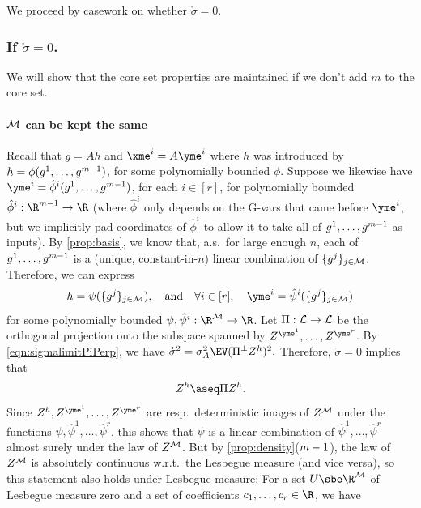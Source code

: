 \documentclass[main.tex]{subfiles}
\begin{document}
We proceed by casework on whether $\mathring \sigma = 0$.

\newcommand{\Lsq}{\mathcal{L}}
\subsubsection{If \texorpdfstring{$\mathring \sigma = 0$}{sigma converges to 0 a.s.}.}

We will show that the core set properties are maintained if we don't add $m$ to the core set.

\paragraph{$\mathcal{M}$ can be kept the same}
Recall that $g = Ah$ and $\xme^i = A \yme^i$ where $h$ was introduced by $h = \phi(g^{1}, \ldots, g^{m - 1})$, for some polynomially bounded $\phi$.
Suppose we likewise have $\yme^i = \hat \phi^i(g^1, \ldots, g^{\MM-1})$, for each $i \in [r]$, for polynomially bounded $\hat \phi^i: \R^{\MM-1} \to \R$ (where $\hat\phi^i$ only depends on the G-vars that came before $\yme^i$, but we implicitly pad coordinates of $\hat \phi^i$ to allow it to take all of $g^1, \ldots, g^{m-1}$ as inputs).
By \ref{prop:basis}, we know that, a.s.\ for large enough $n$, each of $g^1, \ldots, g^{m-1}$ is a (unique, constant-in-$n$) linear combination of $\{g^j\}_{j \in \mathcal{M}}$.
Therefore, we can express
\begin{equation}h = \psi(\{g^j\}_{j \in \coreset}),\quad\text{and}\quad
\forall i \in [r],\quad \yme^i = \hat {\psi}^i(\{g^j\}_{j \in \coreset})
\label{eqn:psireduce}
\end{equation}
for some polynomially bounded $\psi, \hat {\psi}^i: \R^\coreset \to \R$.
Let $\Pi: \mathcal{L} \to \mathcal{L}$ be the orthogonal projection onto the subspace spanned by $Z^{\yme^1}, \ldots, Z^{\yme^r}$.
By \cref{eqn:sigmalimitPiPerp}, we have
\(
\mathring\sigma^2
    =
        \sigma_A^2 \EV (\Pi^\perp Z^h)^2
        .
\)
Therefore, $\mathring \sigma = 0$ implies that 
\[Z^h \aseq \Pi Z^h.\]
Since $Z^h, Z^{\yme^1}, \ldots, Z^{\yme^r}$ are resp.\ deterministic images of $Z^{\mathcal{M}}$ under the functions $\psi, \hat \psi^1, \ldots, \hat \psi^r$, this shows that $\psi$ is a linear combination of $\hat \psi^1, \ldots, \hat \psi^r$ almost surely under the law of $Z^{\mathcal{M}}$.
But by \ref{prop:density}($m-1$), the law of $Z^{\mathcal{M}}$ is absolutely continuous w.r.t.\ the Lesbegue measure (and vice versa), so this statement also holds under Lesbegue measure:
For a set $U \sbe \R^\coreset$ of Lesbegue measure zero and a set of coefficients $c_1, \ldots, c_r \in \R$, we have
\end{document}
